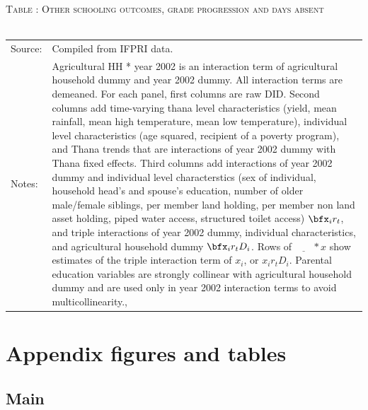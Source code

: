 \begin{table}\hfil\textsc{\footnotesize Table \thetable: Other schooling outcomes, grade progression and days absent\label{zEm.1999.10.sameN}}\\\setlength{\tabcolsep}{.5pt}\renewcommand{\arraystretch}{.675}\hspace{-2em}\hfil\\\renewcommand{\arraystretch}{1}\hfil\begin{tabular}{>{\hfill\scriptsize}p{1cm}<{}>{\scriptsize}p{12cm}<{\hfill}} Source:& Compiled from IFPRI data. \\[-1ex] Notes:&   \textsf{Agricultural HH * year 2002} is an interaction term of agricultural household dummy and year 2002 dummy. All interaction terms are demeaned. For each panel, first columns are raw DID. Second columns add time-varying thana level characteristics (yield, mean rainfall, mean high temperature, mean low temperature), individual level characteristics (age squared, recipient of a poverty program), and \textsf{Thana trends} that are interactions of year 2002 dummy with Thana fixed effects. Third columns add interactions of year 2002 dummy and individual level characterstics (sex of individual, household head's and spouse's education, number of older male/female siblings, per member land holding, per member non land asset holding, piped water access, structured toilet access) $\bfx_{i}r_{t}$, and triple interactions of year 2002 dummy, individual characteristics, and agricultural household dummy $\bfx_{i}r_{t}D_{i}$. Rows of $\underline{\phantom{mm}}*x$ show estimates of the triple interaction term of $x_{i}$, or $x_{i}r_{t}D_{i}$. Parental education variables are strongly collinear with agricultural household dummy and are used only in year 2002 interaction terms to avoid multicollinearity., \\   \end{tabular} \end{table}

\clearpage

\section{Appendix figures and tables}

\subsection{Main}

